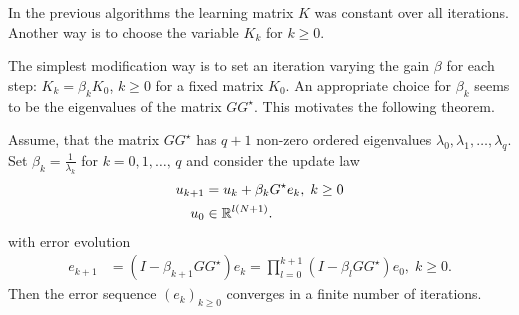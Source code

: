 In the previous algorithms the learning matrix $K$ was constant over all iterations. 
Another way is to choose the variable $K_k$ for $k\geq 0$. 

The simplest modification way is to set an iteration varying the gain $\beta$ for each step: $K_k = \beta_k K_0$, $k\geq 0$ for a fixed matrix $K_0$. 
An appropriate choice for $\beta_k$ seems to be the eigenvalues of the matrix $G G^\star$. This motivates the following theorem. 	


\begin{theo}
	Assume, that the matrix $GG^\star$ has $q+1$ non-zero ordered eigenvalues $\lambda_0, \lambda_1, \dots ,  \lambda_q$. Set $\beta_k = \frac{1}{\lambda_k}$ for $k = 0, 1, \dots, \, q$ and consider the update law
	\begin{align}
	\label{eq:cl_var0}
	\begin{split}
	u_{k+1} &= u_k + \beta_k G^\star e_k, \; k \geq 0\\
	u_0 &\in {\mathbb{R}}^{l (N+1)}.
	\end{split}
	\end{align}
	with error evolution 
	\begin{align}
	e _{k+1} &= (I - \beta_{k+1}  GG^\star) e_{k}  = \prod_{l = 0}^{k+1} (I - \beta_{l}  GG^\star) e_0, \; k\geq 0. 
	\end{align}
	Then the error sequence $(e_k)_{k\geq 0}$ converges in a finite number of iterations.     
\end{theo}
